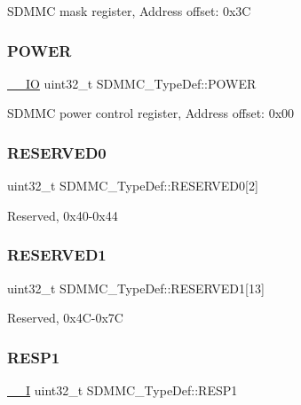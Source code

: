 S\+D\+M\+MC mask register, Address offset\+: 0x3C \mbox{\label{struct_s_d_m_m_c___type_def_ab241f9bc57b5606c7cdad92a94130b5e}} 
\subsubsection{\texorpdfstring{POWER}{POWER}}
{\footnotesize\ttfamily \mbox{\hyperlink{core__sc300_8h_aec43007d9998a0a0e01faede4133d6be}{\+\_\+\+\_\+\+IO}} uint32\+\_\+t S\+D\+M\+M\+C\+\_\+\+Type\+Def\+::\+P\+O\+W\+ER}

S\+D\+M\+MC power control register, Address offset\+: 0x00 \mbox{\label{struct_s_d_m_m_c___type_def_a858b42d5c1c7bdd5b1936dbc87c7e6d0}} 
\subsubsection{\texorpdfstring{RESERVED0}{RESERVED0}}
{\footnotesize\ttfamily uint32\+\_\+t S\+D\+M\+M\+C\+\_\+\+Type\+Def\+::\+R\+E\+S\+E\+R\+V\+E\+D0\mbox{[}2\mbox{]}}

Reserved, 0x40-\/0x44 \mbox{\label{struct_s_d_m_m_c___type_def_a76b438476c886819ad3ff76435cc805b}} 
\subsubsection{\texorpdfstring{RESERVED1}{RESERVED1}}
{\footnotesize\ttfamily uint32\+\_\+t S\+D\+M\+M\+C\+\_\+\+Type\+Def\+::\+R\+E\+S\+E\+R\+V\+E\+D1\mbox{[}13\mbox{]}}

Reserved, 0x4\+C-\/0x7C \mbox{\label{struct_s_d_m_m_c___type_def_aca71c167ec5fbe3884109e0bd3fb51fb}} 
\subsubsection{\texorpdfstring{RESP1}{RESP1}}
{\footnotesize\ttfamily \mbox{\hyperlink{core__sc300_8h_af63697ed9952cc71e1225efe205f6cd3}{\+\_\+\+\_\+I}} uint32\+\_\+t S\+D\+M\+M\+C\+\_\+\+Type\+Def\+::\+R\+E\+S\+P1}

